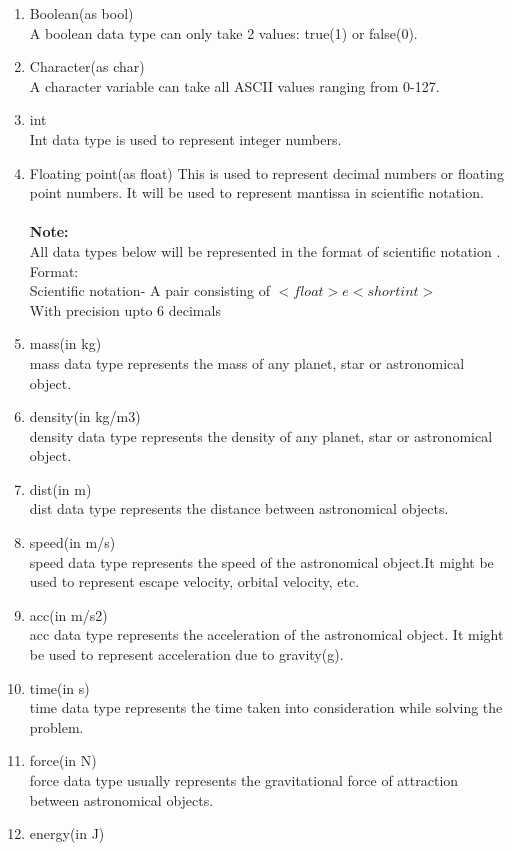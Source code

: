 \documentclass[11pt]{article}
\begin{document}
\begin{enumerate}
\item Boolean(as bool)\\
    A boolean data type can only take 2 values: true(1) or false(0).
\item Character(as char)\\
	A character variable can take all ASCII values ranging from 0-127.
\item  int\\
	Int data type is used to represent integer numbers.
\item Floating point(as float)
This is used to represent decimal numbers or floating point numbers. It will be used to represent mantissa in scientific notation.\\ \\
\textbf{Note:}\\
All data types below will be represented in the format of scientific notation . 
Format:\\
Scientific notation- A pair consisting of $ <float>e<short int>$\\
With precision upto 6 decimals
\item mass(in kg)\\
mass data type represents the mass of any planet, star or astronomical object.
\item density(in kg/m3)\\
density data type represents the density of any planet, star or astronomical object.
\item dist(in m)\\
dist data type represents the distance between astronomical objects.
\item speed(in m/s)\\
speed data type represents the speed of the astronomical object.It might be used to represent escape velocity, orbital velocity, etc.
\item acc(in m/s2)\\
acc data type represents the acceleration of the astronomical object. It might be used to represent acceleration due to gravity(g).
\item time(in s)\\
time data type represents the time taken into consideration while solving the problem.
\item force(in N)\\
force data type usually represents the gravitational force of attraction between astronomical objects.
\item energy(in J)\\

\end{enumerate}
\end{document}
